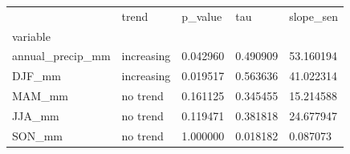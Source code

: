 \begin{tabular}{lllll}
\toprule
 & trend & p\_value & tau & slope\_sen \\
variable &  &  &  &  \\
\midrule
annual\_precip\_mm & increasing & 0.042960 & 0.490909 & 53.160194 \\
DJF\_mm & increasing & 0.019517 & 0.563636 & 41.022314 \\
MAM\_mm & no trend & 0.161125 & 0.345455 & 15.214588 \\
JJA\_mm & no trend & 0.119471 & 0.381818 & 24.677947 \\
SON\_mm & no trend & 1.000000 & 0.018182 & 0.087073 \\
\bottomrule
\end{tabular}

